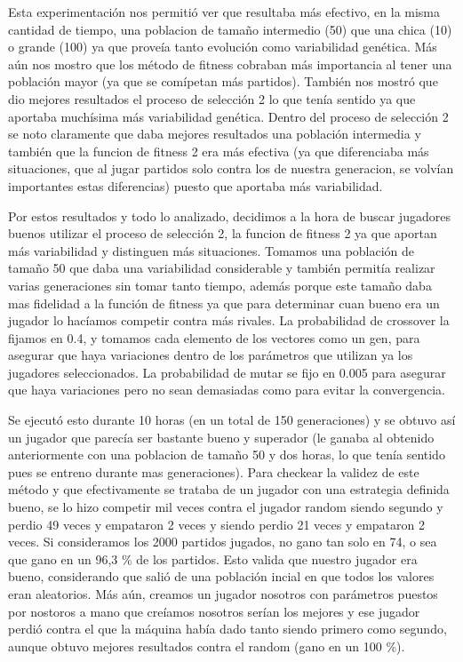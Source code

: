 \documentclass[A4paper,oneside,fleqn,11pt]{article}
\theoremstyle{definition}
\begin{document}
Esta experimentación nos permitió ver que resultaba más efectivo, en la misma cantidad de tiempo, una poblacion de tamaño intermedio (50) que una chica (10) o grande (100) ya que proveía tanto evolución como variabilidad genética. Más aún nos mostro que los método de fitness cobraban más importancia al tener una población mayor (ya que se comípetan más partidos). También nos mostró que dio mejores resultados el proceso de selección 2 lo que tenía sentido ya que aportaba muchísima más variabilidad genética. Dentro del proceso de selección 2 se noto claramente que daba mejores resultados una población intermedia y también que la funcion de fitness 2 era más efectiva (ya que diferenciaba más situaciones, que al jugar partidos solo contra los de nuestra generacion, se volvían importantes estas diferencias) puesto que aportaba más variabilidad.

Por estos resultados y todo lo analizado, decidimos a la hora de buscar jugadores buenos utilizar el proceso de selección 2, la funcion de fitness 2 ya que aportan más variabilidad y distinguen más situaciones. Tomamos una población de tamaño 50 que daba una variabilidad considerable y también permitía realizar varias generaciones sin tomar tanto tiempo, además porque este tamaño daba mas fidelidad a la función de fitness ya que para determinar cuan bueno era un jugador lo hacíamos competir contra más rivales. La probabilidad de crossover la fijamos en 0.4, y tomamos cada elemento de los vectores como un gen, para asegurar que haya variaciones dentro de los parámetros que utilizan ya los jugadores seleccionados. La probabilidad de mutar se fijo en 0.005 para asegurar que haya variaciones pero no sean demasiadas como para evitar la convergencia.

Se ejecutó esto durante 10 horas (en un total de 150 generaciones) y se obtuvo así un jugador que parecía ser bastante bueno y superador (le ganaba al obtenido anteriormente con una poblacion de tamaño 50 y dos horas, lo que tenía sentido pues se entreno durante mas generaciones). Para checkear la validez de este método y que efectivamente se trataba de un jugador con una estrategia definida bueno, se lo hizo competir mil veces contra el jugador random siendo segundo y perdio 49 veces y empataron 2 veces y siendo perdio 21 veces y empataron 2 veces. Si consideramos los 2000 partidos jugados, no gano tan solo en 74, o sea que gano en un 96,3 \% de los partidos. Esto valida que nuestro jugador era bueno, considerando que salió de una población incial en que todos los valores eran aleatorios. Más aún, creamos un jugador nosotros con parámetros puestos por nostoros a mano que creíamos nosotros serían los mejores y ese jugador perdió contra el que la máquina había dado tanto siendo primero como segundo, aunque obtuvo mejores resultados contra el random (gano en un 100 \%).
\end{document}
